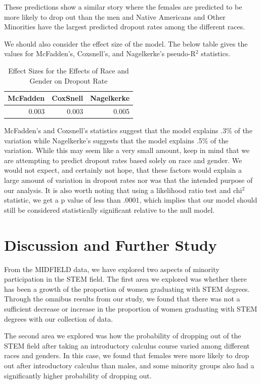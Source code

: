 \documentclass[]{article}
\begin{document}
These predictions show a similar story where the females are predicted
to be more likely to drop out than the men and Native Americans and
Other Minorities have the largest predicted dropout rates among the
different races.

We should also consider the effect size of the model. The below table
gives the values for McFadden's, Coxsnell's, and Nagelkerke's
pseudo-R\(^2\) statistics.

\begin{table}[H]

\caption{\label{tab:efntable}Effect Sizes for the Effects of Race and Gender on Dropout Rate}
\centering
\fontsize{12}{14}\selectfont
\begin{tabular}[t]{r|r|r}
\hline
McFadden & CoxSnell & Nagelkerke\\
\hline
0.003 & 0.003 & 0.005\\
\hline
\end{tabular}
\end{table}

McFadden's and Coxsnell's statistics suggest that the model explains
.3\% of the variation while Nagelkerke's suggests that the model
explains .5\% of the variation. While this may seem like a very small
amount, keep in mind that we are attempting to predict dropout rates
based solely on race and gender. We would not expect, and certainly not
hope, that these factors would explain a large amount of variation in
dropout rates nor was that the intended purpose of our analysis. It is
also worth noting that using a likelihood ratio test and chi\(^2\)
statistic, we get a p value of less than .0001, which implies that our
model should still be considered statistically significant relative to
the null model.

\section{Discussion and Further
Study}\label{discussion-and-further-study}

From the MIDFIELD data, we have explored two aspects of minority
participation in the STEM field. The first area we explored was whether
there has been a growth of the proportion of women graduating with STEM
degrees. Through the omnibus results from our study, we found that there
was not a sufficient decrease or increase in the proportion of women
graduating with STEM degrees with our collection of data.

The second area we explored was how the probability of dropping out of
the STEM field after taking an introductory calculus course varied among
different races and genders. In this case, we found that females were
more likely to drop out after introductory calculus than males, and some
minority groups also had a significantly higher probability of dropping
out.
\end{document}
